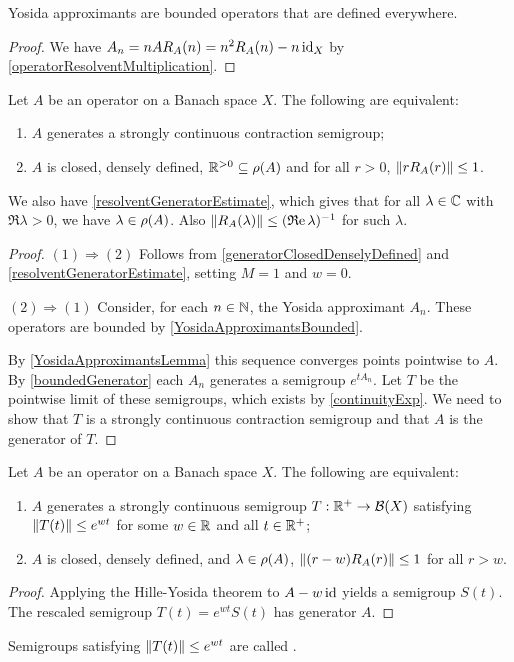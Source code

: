\begin{lemma} \label{YosidaApproximantsBounded}
Yosida approximants are bounded operators that are defined everywhere.
\end{lemma}
\begin{proof}
We have $A_n = nAR_A(n) = n^2R_A(n) - n\operatorname{id}_X$ by \ref{operatorResolventMultiplication}.
\end{proof}

\begin{theorem} \label{HilleYosidaContraction}
Let $A$ be an operator on a Banach space $X$. The following are equivalent:
\begin{enumerate}
\item $A$ generates a strongly continuous contraction semigroup;
\item $A$ is closed, densely defined, $\mathbb{R}^{>0}\subseteq \rho(A)$ and for all $r > 0$, $\lVert rR_A(r)\rVert \leq 1$.
\end{enumerate}
\end{theorem}
We also have \ref{resolventGeneratorEstimate}, which gives that for all $\lambda\in\mathbb{C}$ with $\Re\lambda >0$, we have $\lambda\in\rho(A)$. Also $\lVert R_A(\lambda)\rVert \leq (\operatorname{\mathfrak{R}e} \lambda)^{-1}$ for such $\lambda$.
\begin{proof}
$(1)\Rightarrow (2)$ Follows from \ref{generatorClosedDenselyDefined} and \ref{resolventGeneratorEstimate}, setting $M = 1$ and $w = 0$.

$(2)\Rightarrow (1)$ Consider, for each $n\in \mathbb{N}$, the Yosida approximant $A_n$. These operators are bounded by \ref{YosidaApproximantsBounded}.

By \ref{YosidaApproximantsLemma} this sequence converges points pointwise to $A$. By \ref{boundedGenerator} each $A_n$ generates a semigroup $e^{tA_n}$. Let $T$ be the pointwise limit of these semigroups, which exists by \ref{continuityExp}. We need to show that $T$ is a strongly continuous contraction semigroup and that $A$ is the generator of $T$.


\end{proof}
\begin{corollary} \label{quasiContractiveHilleYosida}
Let $A$ be an operator on a Banach space $X$. The following are equivalent:
\begin{enumerate}
\item $A$ generates a strongly continuous semigroup $T: \mathbb{R}^+\to \operatorname{\mathcal{B}}(X)$ satisfying $\lVert T(t)\rVert\leq e^{wt}$ for some $w\in \mathbb{R}$ and all $t\in\mathbb{R}^+$;
\item $A$ is closed, densely defined, and $\lambda\in  \rho(A)$, $\lVert(r-w)R_A(r)\rVert \leq 1$ for all $r>w$.
\end{enumerate}
\end{corollary}
\begin{proof}
Applying the Hille-Yosida theorem to $A-w\operatorname{id}$ yields a semigroup $S(t)$. The rescaled semigroup $T(t) = e^{wt}S(t)$ has generator $A$.
\end{proof}
Semigroups satisfying $\lVert T(t)\rVert \leq e^{wt}$ are called .

